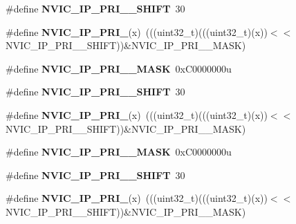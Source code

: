 \begin{DoxyCompactItemize}
\#define {\bfseries N\+V\+I\+C\+\_\+\+I\+P\+\_\+\+P\+R\+I\+\_\+\_\+\+S\+H\+I\+FT}~30
\item 
\mbox{\label{group___n_v_i_c___register___masks_ga5d8180d6ef5d39d0726b35141c024671}} 
\#define {\bfseries N\+V\+I\+C\+\_\+\+I\+P\+\_\+\+P\+R\+I\+\_}(x)~(((uint32\+\_\+t)(((uint32\+\_\+t)(x))$<$$<$N\+V\+I\+C\+\_\+\+I\+P\+\_\+\+P\+R\+I\+\_\+\_\+\+S\+H\+I\+FT))\&N\+V\+I\+C\+\_\+\+I\+P\+\_\+\+P\+R\+I\+\_\+\_\+\+M\+A\+SK)
\item 
\mbox{\label{group___n_v_i_c___register___masks_gaa6eb455f6bfa8fcb95723cf8086c14f3}} 
\#define {\bfseries N\+V\+I\+C\+\_\+\+I\+P\+\_\+\+P\+R\+I\+\_\+\_\+\+M\+A\+SK}~0x\+C0000000u
\item 
\mbox{\label{group___n_v_i_c___register___masks_ga5bc982719d99986693dcc1bc4d72446e}} 
\#define {\bfseries N\+V\+I\+C\+\_\+\+I\+P\+\_\+\+P\+R\+I\+\_\+\_\+\+S\+H\+I\+FT}~30
\item 
\mbox{\label{group___n_v_i_c___register___masks_ga89f959b5cf4359b783ec924f1546486b}} 
\#define {\bfseries N\+V\+I\+C\+\_\+\+I\+P\+\_\+\+P\+R\+I\+\_}(x)~(((uint32\+\_\+t)(((uint32\+\_\+t)(x))$<$$<$N\+V\+I\+C\+\_\+\+I\+P\+\_\+\+P\+R\+I\+\_\+\_\+\+S\+H\+I\+FT))\&N\+V\+I\+C\+\_\+\+I\+P\+\_\+\+P\+R\+I\+\_\+\_\+\+M\+A\+SK)
\item 
\mbox{\label{group___n_v_i_c___register___masks_ga7d7c0405750d75219f0fe0e3c5f48a26}} 
\#define {\bfseries N\+V\+I\+C\+\_\+\+I\+P\+\_\+\+P\+R\+I\+\_\+\_\+\+M\+A\+SK}~0x\+C0000000u
\item 
\mbox{\label{group___n_v_i_c___register___masks_ga776c73ffc75170acf87f8bb3cf86ba6a}} 
\#define {\bfseries N\+V\+I\+C\+\_\+\+I\+P\+\_\+\+P\+R\+I\+\_\+\_\+\+S\+H\+I\+FT}~30
\item 
\mbox{\label{group___n_v_i_c___register___masks_ga7bfc5eab0b9ee859499ec94e3e6f013c}} 
\#define {\bfseries N\+V\+I\+C\+\_\+\+I\+P\+\_\+\+P\+R\+I\+\_}(x)~(((uint32\+\_\+t)(((uint32\+\_\+t)(x))$<$$<$N\+V\+I\+C\+\_\+\+I\+P\+\_\+\+P\+R\+I\+\_\+\_\+\+S\+H\+I\+FT))\&N\+V\+I\+C\+\_\+\+I\+P\+\_\+\+P\+R\+I\+\_\+\_\+\+M\+A\+SK)
$$
\end{DoxyCompactItemize}
